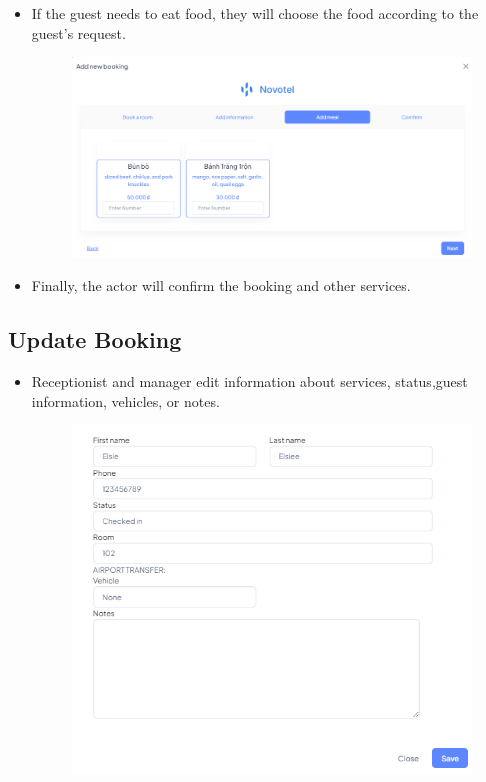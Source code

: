 \begin{itemize}
\begin{figure}[H]
            \label{fig:addinfor_room}
        \end{figure}
        \item If the guest needs to eat food, they will choose the food according to the guest's request.
        \begin{figure}[H]
            \includegraphics[width=1\linewidth]{img/bookmeal.png}
            \label{fig:bookmealroom}
        \end{figure}
        \item Finally, the actor will confirm the booking and other services.
    \end{itemize}
    \subsection{Update Booking}
    \begin{itemize}
        \item Receptionist and manager edit information about services, status,guest information, vehicles, or notes.
        \begin{figure}[H]
            \includegraphics[width=1\linewidth]{img/editbookroom.png}
            \label{fig:editbookroom}
        \end{figure}
    \end{itemize}
